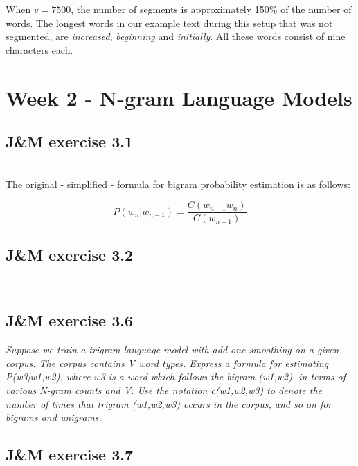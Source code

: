 \documentclass[a4paper, 11pt]{article}
\begin{document}
When $v=7500$, the number of segments is approximately 150\% of the number of words. The longest words in our example text during this setup that was not segmented, are \textit{increased}, \textit{beginning} and \textit{initially}. All these words consist of nine characters each.

\section{Week 2 - N-gram Language Models}

\subsection{J\&M exercise 3.1}

\noindent{}\\


The original - simplified - formula for bigram probability estimation is as follows:

$$P(w_{n} | w_{n-1}) = \frac{C(w_{n-1}w_{n})}{C(w_{n-1})}$$

\subsection{J\&M exercise 3.2}

\noindent{}\\

\subsection{J\&M exercise 3.6}

\textit{Suppose we train a trigram language model with add-one smoothing on a given corpus. The corpus contains V word types. Express a formula for estimating P(w3|w1,w2), where w3 is a word which follows the bigram (w1,w2), in terms of various N-gram counts and V. Use the notation c(w1,w2,w3) to denote the number of times that trigram (w1,w2,w3) occurs in the corpus, and so on for bigrams and unigrams.}

\subsection{J\&M exercise 3.7}
\end{document}
